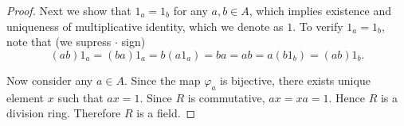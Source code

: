 \begin{itemize}[resume]
\begin{proof}
	Next we show that $1_a = 1_b$ for any $a, b \in A$, which implies existence and uniqueness of multiplicative identity, which we denote as $1$. To verify $1_a = 1_b$, note that (we supress $\cdot$ sign)
	\[
		(ab)1_a = (ba)1_a = b(a 1_a) = ba = ab = a(b 1_b) = (ab) 1_b
			.\] 
	
	Now consider any $a \in A$. Since the map $\varphi_a$ is bijective, there exists unique element $x$ such that $ax = 1$. Since $R$ is commutative, $ax = xa = 1$. Hence $R$ is a division ring. Therefore $R$ is a field.
\end{proof}

\end{itemize}
